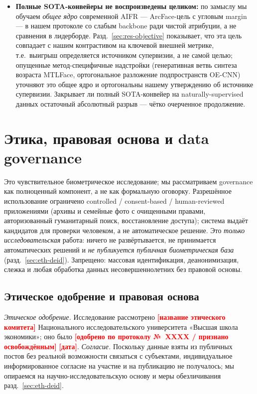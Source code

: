 \documentclass[journal]{IEEEtran}
\newcommand{\fillin}[1]{\textcolor{red}{\textbf{[#1]}}}
\begin{document}
\begin{itemize}[leftmargin=1.2em]
\item \textbf{Полные SOTA-конвейеры не воспроизведены целиком:} по замыслу мы обучаем \emph{общее ядро} современной AIFR --- ArcFace-цель с угловым margin --- в нашем протоколе со слабым backbone ради чистой атрибуции, а не сравнения в лидерборде. Разд.~\ref{sec:res-objective} показывает, что эта цель совпадает с нашим контрастивом на ключевой внешней метрике, т.е.\ выигрыш определяется источником супервизии, а не самой целью; опущенные метод-специфичные надстройки (генеративная ветвь синтеза возраста MTLFace, ортогональное разложение подпространств OE-CNN) уточняют это общее ядро и ортогональны нашему утверждению об источнике супервизии. Закрывает ли полный SOTA-конвейер на naturally-supervised данных остаточный абсолютный разрыв --- чётко очерченное продолжение.
\end{itemize}

\section{Этика, правовая основа и data governance}\label{sec:ethics}
Это чувствительное биометрическое исследование; мы рассматриваем governance как полноценный компонент, а не как формальную оговорку. Разрешённое использование ограничено controlled / consent-based / human-reviewed приложениями (архивы и семейные фото с очищенными правами, авторизованный гуманитарный поиск, восстановление доступа); система выдаёт кандидатов для проверки человеком, а не автоматическое решение. Это \emph{только исследовательская} работа: ничего не развёртывается, не принимается автоматических решений и \emph{не публикуется публичная биометрическая база} (разд.~\ref{sec:eth-deid}). Запрещено: массовая идентификация, деанонимизация, слежка и любая обработка данных несовершеннолетних без правовой основы.

\subsection{Этическое одобрение и правовая основа}\label{sec:eth-legal}
\emph{Этическое одобрение.} Исследование рассмотрено \fillin{название этического комитета} Национального исследовательского университета «Высшая школа экономики»; оно было \fillin{одобрено по протоколу №\ XXXX / признано освобождённым} \fillin{дата}. \emph{Согласие.} Поскольку данные взяты из публичных постов без реальной возможности связаться с субъектами, индивидуальное информированное согласие на участие и на публикацию не получалось; мы опираемся на научно-исследовательскую основу и меры обезличивания разд.~\ref{sec:eth-deid}.
\end{document}
